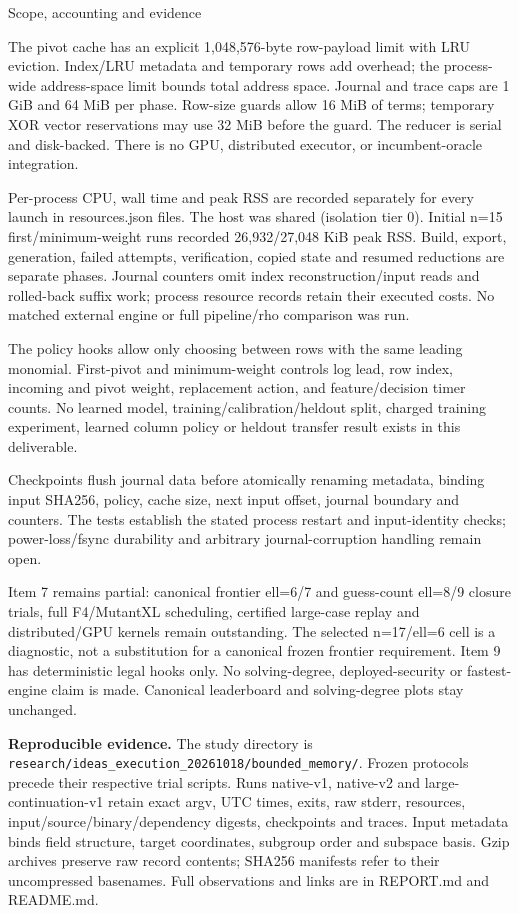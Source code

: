 \documentclass[10pt]{article}
\begin{document}
\newpage
{\large Scope, accounting and evidence}\par
The pivot cache has an explicit 1,048,576-byte row-payload limit with LRU eviction.
Index/LRU metadata and temporary rows add overhead; the process-wide address-space
limit bounds total address space. Journal and trace caps are 1 GiB and 64 MiB
per phase. Row-size guards allow 16 MiB of terms; temporary XOR vector
reservations may use 32 MiB before the guard. The reducer is serial and disk-backed.
There is no GPU, distributed executor, or incumbent-oracle integration.

Per-process CPU, wall time and peak RSS are recorded separately for every launch
in resources.json files. The host was shared (isolation tier 0). Initial n=15
first/minimum-weight runs recorded 26,932/27,048 KiB peak RSS. Build, export,
generation, failed attempts, verification, copied state and resumed reductions
are separate phases. Journal counters omit index reconstruction/input reads
and rolled-back suffix work; process resource records retain their executed
costs. No matched external engine or full pipeline/rho comparison was run.

The policy hooks allow only choosing between rows with the same leading
monomial. First-pivot and minimum-weight controls log lead, row index, incoming
and pivot weight, replacement action, and feature/decision timer counts.
No learned model, training/calibration/heldout split, charged training experiment,
learned column policy or heldout transfer result exists in this deliverable.

Checkpoints flush journal data before atomically renaming metadata, binding input
SHA256, policy, cache size, next input offset, journal boundary and counters.
The tests establish the stated process restart and input-identity checks;
power-loss/fsync durability and arbitrary journal-corruption handling remain open.

Item 7 remains partial: canonical frontier ell=6/7 and guess-count ell=8/9 closure
trials, full F4/MutantXL scheduling, certified large-case replay and distributed/GPU
kernels remain outstanding. The selected n=17/ell=6 cell is a diagnostic, not a
substitution for a canonical frozen frontier requirement. Item 9 has deterministic
legal hooks only. No solving-degree, deployed-security or fastest-engine claim
is made. Canonical leaderboard and solving-degree plots stay unchanged.

\textbf{Reproducible evidence.} The study directory is
\texttt{research/ideas\_execution\_20261018/bounded\_memory/}.
Frozen protocols precede their respective trial scripts. Runs native-v1,
native-v2 and large-continuation-v1 retain exact argv, UTC times, exits, raw
stderr, resources, input/source/binary/dependency digests, checkpoints and traces.
Input metadata binds field structure, target coordinates, subgroup order and
subspace basis. Gzip archives preserve raw record contents; SHA256 manifests
refer to their uncompressed basenames. Full observations and links are in
REPORT.md and README.md.
\end{document}
